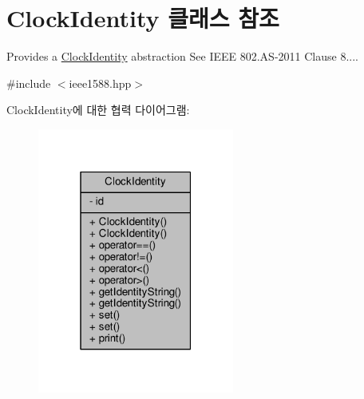 \hypertarget{class_clock_identity}{}\section{Clock\+Identity 클래스 참조}
\label{class_clock_identity}


Provides a \hyperlink{class_clock_identity}{Clock\+Identity} abstraction See I\+E\+EE 802.\+AS-\/2011 Clause 8....  




{\ttfamily \#include $<$ieee1588.\+hpp$>$}



Clock\+Identity에 대한 협력 다이어그램\+:
\nopagebreak
\begin{figure}[H]
\begin{center}
\leavevmode
\includegraphics[width=183pt]{class_clock_identity__coll__graph}
\end{center}
\end{figure}
